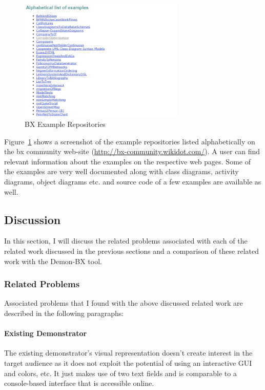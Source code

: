 \begin{figure}
	\includegraphics[width=0.7\textwidth]{figures/Bx_ExampleRepo}
	\caption{BX Example Repositories}
	\label{fig:Bx_ExampleRepo}
\end{figure}

Figure~\ref{fig:Bx_ExampleRepo} shows a screenshot of the example repositories listed alphabetically on the bx community web-site (\url{http://bx-community.wikidot.com/}). A user can find relevant information about the examples on the respective web pages. Some of the examples are very well documented along with class diagrams, activity diagrams, object diagrams etc. and source code of a few examples are available as well.

\subsection{Discussion}\label{subsec:discussion}
In this section, I will discuss the related problems associated with each of the related work discussed in the previous sections and a comparison of these related work with the Demon-BX tool.

\subsubsection{Related Problems}\label{subsubsec:relatedproblems}
Associated problems that I found with the above discussed related work are described in the following paragraphs: 

\paragraph{Existing Demonstrator}
The existing demonstrator's visual representation doesn't create interest in the target audience as it does not exploit the potential of using an interactive GUI and colors, etc. It just makes use of two text fields and is comparable to a console-based interface that is accessible online.

